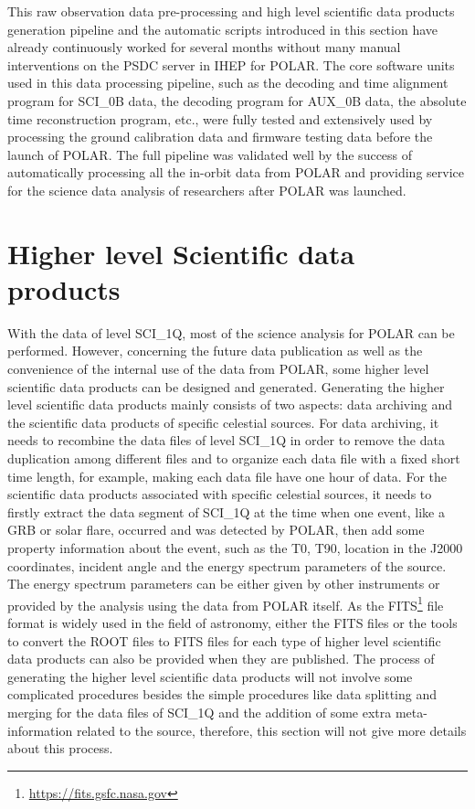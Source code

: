\documentclass{raa}
\begin{document}
This raw observation data pre-processing and high level scientific data products generation pipeline and the automatic scripts introduced in this section have already continuously worked for several months without many manual interventions on the PSDC server in IHEP for POLAR. The core software units used in this data processing pipeline, such as the decoding and time alignment program for SCI\_0B data, the decoding program for AUX\_0B data, the absolute time reconstruction program, etc., were fully tested and extensively used by processing the ground calibration data and firmware testing data before the launch of POLAR. The full pipeline was validated well by the success of automatically processing all the in-orbit data from POLAR and providing service for the science data analysis of researchers after POLAR was launched.

\section{Higher level Scientific data products}

With the data of level SCI\_1Q, most of the science analysis for POLAR can be performed. However, concerning the future data publication as well as the convenience of the internal use of the data from POLAR, some higher level scientific data products can be designed and generated. Generating the higher level scientific data products mainly consists of two aspects: data archiving and the scientific data products of specific celestial sources. For data archiving, it needs to recombine the data files of level SCI\_1Q in order to remove the data duplication among different files and to organize each data file with a fixed short time length, for example, making each data file have one hour of data. For the scientific data products associated with specific celestial sources, it needs to firstly extract the data segment of SCI\_1Q at the time when one event, like a GRB or solar flare, occurred and was detected by POLAR, then add some property information about the event, such as the T0, T90, location in the J2000 coordinates, incident angle and the energy spectrum parameters of the source. The energy spectrum parameters can be either given by other instruments or provided by the analysis using the data from POLAR itself. As the FITS\footnote{\url{https://fits.gsfc.nasa.gov}} file format is widely used in the field of astronomy, either the FITS files or the tools to convert the ROOT files to FITS files for each type of higher level scientific data products can also be provided when they are published. The process of generating the higher level scientific data products will not involve some complicated procedures besides the simple procedures like data splitting and merging for the data files of SCI\_1Q and the addition of some extra meta-information related to the source, therefore, this section will not give more details about this process.
\end{document}
